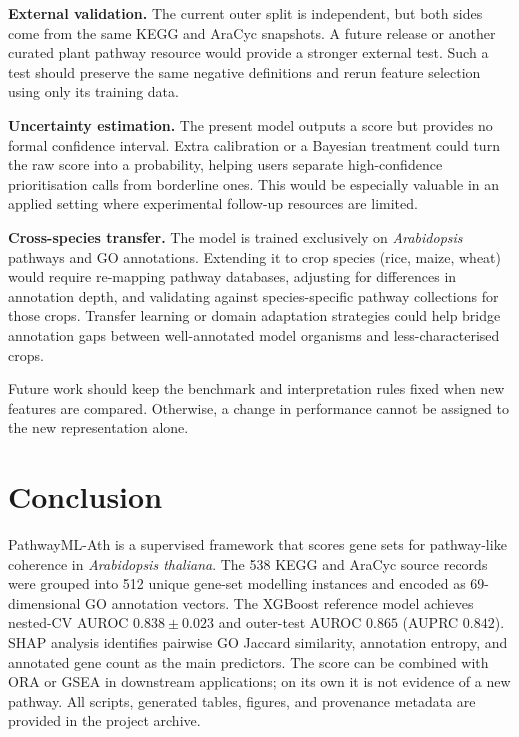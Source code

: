 \documentclass[12pt,letterpaper,oneside,openany]{book}
\begin{document}
\textbf{External validation.} The current outer split is independent, but both sides come from the same KEGG and AraCyc snapshots. A future release or another curated plant pathway resource would provide a stronger external test. Such a test should preserve the same negative definitions and rerun feature selection using only its training data.

\textbf{Uncertainty estimation.} The present model outputs a score but provides no formal confidence interval. Extra calibration or a Bayesian treatment could turn the raw score into a probability, helping users separate high-confidence prioritisation calls from borderline ones. This would be especially valuable in an applied setting where experimental follow-up resources are limited.

\textbf{Cross-species transfer.} The model is trained exclusively on \textit{Arabidopsis} pathways and GO annotations. Extending it to crop species (rice, maize, wheat) would require re-mapping pathway databases, adjusting for differences in annotation depth, and validating against species-specific pathway collections for those crops. Transfer learning or domain adaptation strategies could help bridge annotation gaps between well-annotated model organisms and less-characterised crops.

Future work should keep the benchmark and interpretation rules fixed when new features are compared. Otherwise, a change in performance cannot be assigned to the new representation alone.


\chapter{Conclusion}
\label{sec:conclusion}

PathwayML-Ath is a supervised framework that scores gene sets for pathway-like coherence in \textit{Arabidopsis thaliana}. The 538 KEGG and AraCyc source records were grouped into 512 unique gene-set modelling instances and encoded as 69-dimensional GO annotation vectors. The XGBoost reference model achieves nested-CV AUROC $0.838 \pm 0.023$ and outer-test AUROC $0.865$ (AUPRC $0.842$). SHAP analysis identifies pairwise GO Jaccard similarity, annotation entropy, and annotated gene count as the main predictors. The score can be combined with ORA or GSEA in downstream applications; on its own it is not evidence of a new pathway. All scripts, generated tables, figures, and provenance metadata are provided in the project archive.
\end{document}
